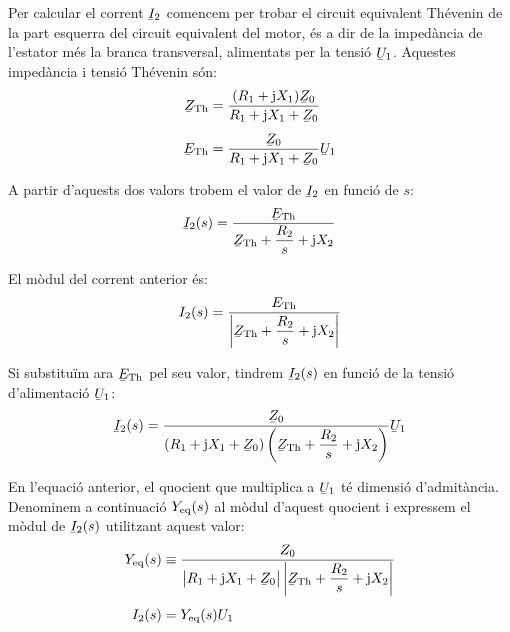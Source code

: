 Per calcular el corrent $\cmplx{I}_2$ comencem per trobar el circuit equivalent Thévenin de la part esquerra del circuit equivalent del motor, és a dir de la impedància de l'estator més la branca transversal, alimentats per la tensió $\cmplx{U}_1$. Aquestes impedància i tensió Thévenin són:
\begin{subequations}
\begin{align}
    \cmplx{Z}\ped{Th} &= \frac{(R_1 + \ju X_1) \cmplx{Z}_0}{R_1 + \ju X_1 + \cmplx{Z}_0} \label{eq:mot-ZTh} \\[1ex]
    \cmplx{E}\ped{Th} &= \frac{\cmplx{Z}_0}{R_1 + \ju X_1 + \cmplx{Z}_0} \cmplx{U}_1 \label{eq:mot-ETh}
\end{align}
\end{subequations}

A partir d'aquests dos valors trobem el valor de $\cmplx{I}_2$ en funció de $s$:
\begin{equation}
    \cmplx{I}_2(s) = \frac{\cmplx{E}\ped{Th}}{\cmplx{Z}\ped{Th} + \dfrac{R_2}{s} + \ju X_2}
\end{equation}

El mòdul del corrent anterior és:
\begin{equation}
    I_2(s) = \frac{E\ped{Th}}{\left|\cmplx{Z}\ped{Th} + \dfrac{R_2}{s} + \ju X_2\right|} \label{eq-mot-I2}
\end{equation}

Si substituïm  ara $\cmplx{E}\ped{Th}$ pel seu valor, tindrem $\cmplx{I}_2(s)$ en funció de la tensió d'alimentació $\cmplx{U}_1$:
\begin{equation}
    \cmplx{I}_2(s) = \frac{\cmplx{Z}_0}{(R_1 + \ju X_1 + \cmplx{Z}_0)\left(\cmplx{Z}\ped{Th} + \dfrac{R_2}{s} + \ju X_2\right)} \cmplx{U}_1\label{eq:mot-I2}
\end{equation}

En l'equació anterior, el quocient que multiplica a $\cmplx{U}_1$ té dimensió d'admitància. Denominem a continuació $Y_\mathrm{eq}(s)$ al mòdul d'aquest quocient i expressem el mòdul de $\cmplx{I}_2(s)$ utilitzant aquest valor:
\begin{subequations}
\begin{align}
    Y\ped{eq}(s) &\equiv \frac{Z_0}{\big|R_1 + \ju X_1 + \cmplx{Z}_0\big| \left|\cmplx{Z}\ped{Th} + \dfrac{R_2}{s} + \ju X_2\right|}\label{eq:mot-Yeq}  \\[1ex]
    I_2(s) &= Y\ped{eq}(s) U_1
\end{align}
\end{subequations}

